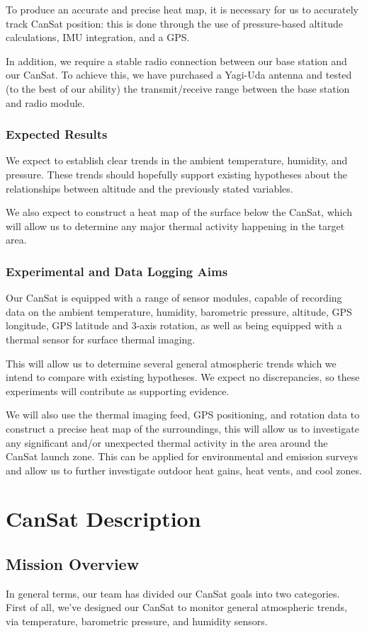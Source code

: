\documentclass[]{report}
\begin{document}
To produce an accurate and precise heat map, it is necessary for us to accurately track CanSat position: this is done through the use of pressure-based altitude calculations, IMU integration, and a GPS.

In addition, we require a stable radio connection between our base station and our CanSat. To achieve this, we have purchased a Yagi-Uda antenna and tested (to the best of our ability) the transmit/receive range between the base station and radio module.
\subsection{Expected Results}
We expect to establish clear trends in the ambient temperature, humidity, and pressure. These trends should hopefully support existing hypotheses about the relationships between altitude and the previously stated variables.

We also expect to construct a heat map of the surface below the CanSat, which will allow us to determine any major thermal activity happening in the target area.
\subsection{Experimental and Data Logging Aims}
Our CanSat is equipped with a range of sensor modules, capable of recording data on the ambient temperature, humidity, barometric pressure, altitude, GPS longitude, GPS latitude and 3-axis rotation, as well as being equipped with a thermal sensor for surface thermal imaging.

This will allow us to determine several general atmospheric trends which we intend to compare with existing hypotheses. We expect no discrepancies, so these experiments will contribute as supporting evidence.

We will also use the thermal imaging feed, GPS positioning, and rotation data to construct a precise heat map of the surroundings, this will allow us to investigate any significant and/or unexpected thermal activity in the area around the CanSat launch zone. This can be applied for environmental and emission surveys and allow us to further investigate outdoor heat gains, heat vents, and cool zones.

\chapter{CanSat Description}
\section{Mission Overview}
In general terms, our team has divided our CanSat goals into two categories. First of all, we've designed our CanSat to monitor general atmospheric trends, via temperature, barometric pressure, and humidity sensors.
\end{document}
